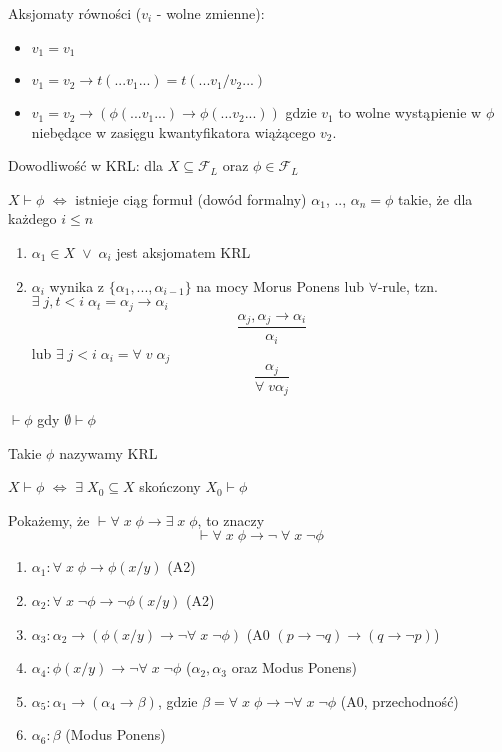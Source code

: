 Aksjomaty równości ($v_i$ - wolne zmienne):
\begin{itemize}
  \item $v_1=v_1$
  \item $v_1=v_2\to t(...v_1...)=t(...v_1/v_2...)$ 
  \item $v_1=v_2\to (\phi(...v_1...)\to \phi(...v_2...))$ gdzie $v_1$ to wolne wystąpienie w $\phi$ niebędące w zasięgu kwantyfikatora wiążącego $v_2$.
\end{itemize}

\begin{definition}{}{}
  Dowodliwość w KRL: dla $X\subseteq \mathcal{F}_L$ oraz $\phi\in\mathcal{F}_L$

  $X\vdash \phi$ $\iff$ istnieje ciąg formuł (dowód formalny) $\alpha_1$, .., $\alpha_n=\phi$ takie, że dla każdego $i\leq n$
  \begin{enumerate}
    \item $\alpha_1\in X\;\lor\;\alpha_i$ jest aksjomatem KRL
    \item $\alpha_i$ wynika z $\{\alpha_1,...,\alpha_{i-1}\}$ na mocy Morus Ponens lub $\forall$-rule, tzn. $\exists\;j,t<i\;\alpha_t=\alpha_j\to \alpha_i$
      $$\frac{\alpha_j,\alpha_j\to\alpha_i}{\alpha_i}$$
      lub $\exists\;j<i\;\alpha_i=\forall\;v\;\alpha_j$
      $$\frac{\alpha_j}{\forall\;v\alpha_j}$$
  \end{enumerate}
\end{definition}

\begin{konwencja}{}{}
  $\vdash \phi$ gdy $\emptyset\vdash\phi$

  Takie $\phi$ nazywamy  KRL
\end{konwencja}

\begin{remark}{}{}
  $X\vdash \phi$ $\iff$ $\exists\;X_0\subseteq X$ skończony $X_0\vdash \phi$
\end{remark}

\begin{example}
  Pokażemy, że $\vdash \forall\;x\;\phi\to\exists\;x\;\phi$, to znaczy
  $$\vdash \forall\;x\;\phi\to \neg\;\forall\;x\;\neg\phi$$
  
  \begin{enumerate}
    \item $\alpha_1:\forall\;x\;\phi\to \phi(x/y)$ (A2)
    \item $\alpha_2:\forall\;x\;\neg\phi\to\neg\phi(x/y)$ (A2)
    \item $\alpha_3:\alpha_2\to (\phi(x/y)\to \neg\forall\;x\;\neg\phi)$ (A0 $(p\to\neg q)\to(q\to\neg p)$)
    \item $\alpha_4:\phi(x/y)\to\neg\forall\;x\;\neg\phi$ ($\alpha_2,\alpha_3$ oraz Modus Ponens)
    \item $\alpha_5:\alpha_1\to(\alpha_4\to \beta)$, gdzie $\beta=\forall\;x\;\phi\to\neg\forall\;x\;\neg\phi$ (A0, przechodność)
    \item $\alpha_6:\beta$ (Modus Ponens)
  \end{enumerate}
\end{example}

